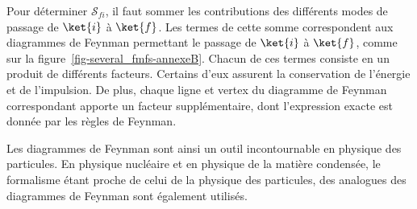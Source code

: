 Pour déterminer $\mathcal{S}_{fi}$, il faut sommer les contributions des différents modes de passage de $\ket{i}$ à $\ket{f}$.
Les termes de cette somme correspondent aux diagrammes de Feynman permettant le passage de $\ket{i}$ à $\ket{f}$, comme sur la figure~\ref{fig-several_fmfs-annexeB}.
Chacun de ces termes consiste en un produit de différents facteurs.
Certains d'eux assurent la conservation de l'énergie et de l'impulsion.
De plus, chaque ligne et vertex du diagramme de Feynman correspondant apporte un facteur supplémentaire, dont l'expression exacte est donnée par les règles de Feynman.
\par Les diagrammes de Feynman sont ainsi un outil incontournable en physique des particules.
En physique nucléaire et en physique de la matière condensée, le formalisme étant proche de celui de la physique des particules, des analogues des diagrammes de Feynman sont également utilisés.